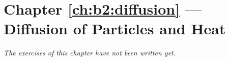 \section*{Chapter \ref{ch:b2:diffusion} --- Diffusion of Particles and Heat}


\emph{The exercises of this chapter have not been written yet.}
